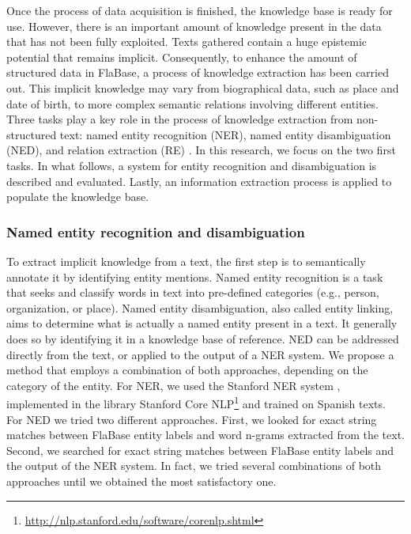 Once the process of data acquisition is finished, the knowledge base is ready for use. However, there is an important amount of knowledge present in the data that has not been fully exploited. Texts gathered contain a huge epistemic potential that remains implicit. Consequently, to enhance the amount of structured data in FlaBase, a process of knowledge extraction has been carried out. This implicit knowledge may vary from biographical data, such as place and date of birth, to more complex semantic relations involving different entities. Three tasks play a key role in the process of knowledge extraction from non-structured text: named entity recognition (NER), named entity disambiguation (NED), and relation extraction (RE) \cite{Usbeck2014}. In this research, we focus on the two first tasks. In what follows, a system for entity recognition and disambiguation is described and evaluated. Lastly, an information extraction process is applied to populate the knowledge base.

\subsubsection{Named entity recognition and disambiguation}\label{sec:musicology:entity_linking}

To extract implicit knowledge from a text, the first step is to semantically annotate it by identifying entity mentions. Named entity recognition is a task that seeks and classify words in text into pre-defined categories (e.g., person, organization, or place). Named entity disambiguation, also called entity linking, aims to determine what is actually a named entity present in a text. It generally does so by identifying it in a knowledge base of reference. NED can be addressed directly from the text, or applied to the output of a NER system. We propose a method that employs a combination of both approaches, depending on the category of the entity. For NER, we used the Stanford NER system \cite{Finkel2005}, implemented in the library Stanford Core NLP\footnote{\url{http://nlp.stanford.edu/software/corenlp.shtml}} and trained on Spanish texts. For NED we tried two different approaches. First, we looked for exact string matches between FlaBase entity labels and word n-grams extracted from the text. Second, we searched for exact string matches between FlaBase entity labels and the output of the NER system. In fact, we tried several combinations of both approaches until we obtained the most satisfactory one.

